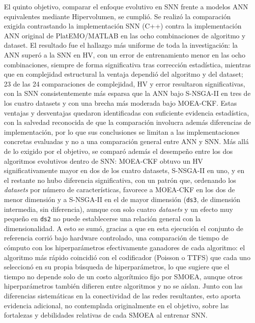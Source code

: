 El quinto objetivo, comparar el enfoque evolutivo en SNN frente a modelos ANN equivalentes mediante Hipervolumen, se cumplió. Se realizó la comparación exigida contrastando la implementación SNN (C++) contra la implementación ANN original de PlatEMO/MATLAB en las ocho combinaciones de algoritmo y dataset. El resultado fue el hallazgo más uniforme de toda la investigación: la ANN superó a la SNN en HV, con un error de entrenamiento menor en las ocho combinaciones, siempre de forma significativa tras corrección estadística, mientras que en complejidad estructural la ventaja dependió del algoritmo y del dataset; 23 de las 24 comparaciones de complejidad, HV y error resultaron significativas, con la SNN consistentemente más esparsa que la ANN bajo S-NSGA-II en tres de los cuatro datasets y con una brecha más moderada bajo MOEA-CKF. Estas ventajas y desventajas quedaron identificadas con suficiente evidencia estadística, con la salvedad reconocida de que la comparación involucra además diferencias de implementación, por lo que sus conclusiones se limitan a las implementaciones concretas evaluadas y no a una comparación general entre ANN y SNN. Más allá de lo exigido por el objetivo, se comparó además el desempeño entre los dos algoritmos evolutivos dentro de SNN: MOEA-CKF obtuvo un HV significativamente mayor en dos de los cuatro datasets, S-NSGA-II en uno, y en el restante no hubo diferencia significativa, con un patrón que, ordenando los \textit{datasets} por número de características, favorece a MOEA-CKF en los dos de menor dimensión y a S-NSGA-II en el de mayor dimensión (\texttt{ds3}, de dimensión intermedia, sin diferencia), aunque con solo cuatro \textit{datasets} y un efecto muy pequeño en \texttt{ds2} no puede establecerse una relación general con la dimensionalidad. A esto se sumó, gracias a que en esta ejecución el conjunto de referencia corrió bajo hardware controlado, una comparación de tiempo de cómputo con los hiperparámetros efectivamente ganadores de cada algoritmo: el algoritmo más rápido coincidió con el codificador (Poisson o TTFS) que cada uno seleccionó en su propia búsqueda de hiperparámetros, lo que sugiere que el tiempo no depende solo de un costo algorítmico fijo por SMOEA, aunque otros hiperparámetros también difieren entre algoritmos y no se aíslan. Junto con las diferencias sistemáticas en la conectividad de las redes resultantes, esto aporta evidencia adicional, no contemplada originalmente en el objetivo, sobre las fortalezas y debilidades relativas de cada SMOEA al entrenar SNN.

